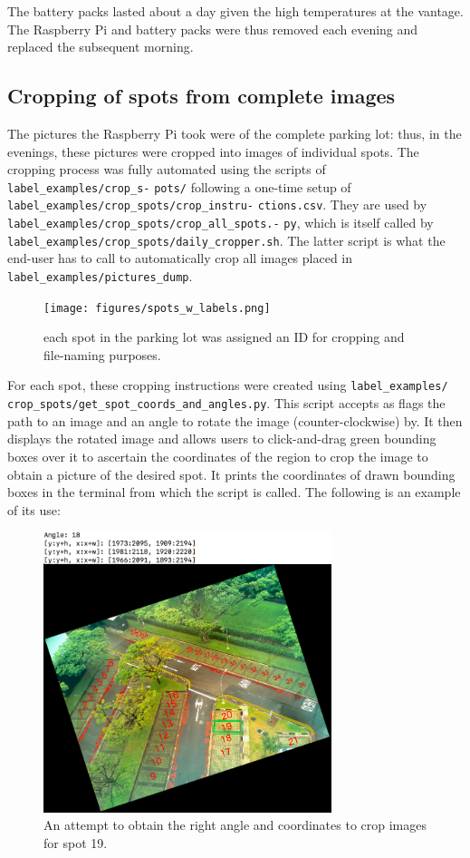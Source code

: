 \documentclass[a4paper, 11pt]{article} %
\begin{document}
		The battery packs lasted about a day given the high temperatures at the 
		vantage. The Raspberry Pi and battery packs were thus removed each 
		evening and replaced the subsequent morning.
	\subsection{Cropping of spots from complete images}
		The pictures the Raspberry Pi took were of the complete parking lot: 
		thus, in the evenings, these pictures were cropped into images of 
		individual spots. The cropping process was fully automated using the 
		scripts of \texttt{label\_examples/crop\_s-} \texttt{pots/} following a 
		one-time 
		setup of 
		\texttt{label\_examples/crop\_spots/crop\_instru-} \texttt{ctions.csv}. 
		They are 
		used by
		\texttt{label\_examples/crop\_spots/crop\_all\_spots.-} \texttt{py}, 
		which is 
		itself called by
		\texttt{label\_examples/crop\_spots/daily\_cropper.sh}. The latter 
		script is 
		what the end-user has to call to automatically
		crop all images placed in \texttt{label\_examples/pictures\_dump}.
		\begin{figure}[H]
			\centering
			\texttt{[image: figures/spots\_w\_labels.png]}
			\caption{each spot in the parking lot was assigned an ID for 
			cropping and file-naming purposes.}
		\end{figure}
		\hspace*{-6mm}For each spot, these cropping instructions were created 
		using \texttt{label\_examples/} 
		\texttt{crop\_spots/get\_spot\_coords\_and\_angles.py}.
		This script accepts as flags
		the path to an image and an angle to rotate the image (counter-clockwise) by. It then displays the
		rotated image and allows users to click-and-drag green bounding boxes 
		over it to ascertain the coordinates
		of the region to crop the image to obtain a picture of the desired spot. It prints the coordinates of drawn
		bounding boxes in the terminal from which the script is called. The following is an example of its use:
		\begin{figure}[H]
			\centering
			\includegraphics[width=0.75\textwidth]{figures/spot_coord_demo}
			\caption{An attempt to obtain the right angle and 
			coordinates to crop images for spot 19.}
		\end{figure}
\end{document}
